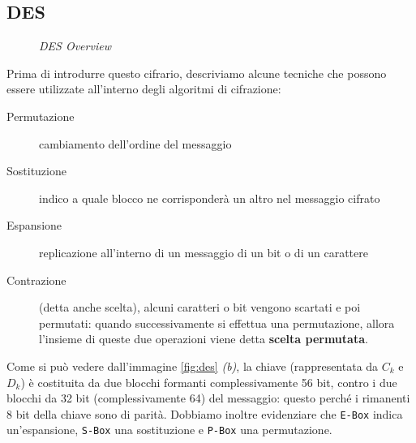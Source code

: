 \subsection{DES}
\begin{figure}[!t]
 \centering
 \caption{\emph{DES Overview}}\label{fig:des}
\end{figure}
Prima di introdurre questo cifrario, descriviamo alcune tecniche che possono
essere utilizzate all'interno degli algoritmi di cifrazione:
\begin{description}
\item[Permutazione] cambiamento dell'ordine del messaggio
\item[Sostituzione] indico a quale blocco ne corrisponderà un altro nel messaggio
	cifrato
\item[Espansione] replicazione all'interno di un messaggio di un bit o di un 
	carattere
\item[Contrazione] (detta anche scelta), 
	alcuni caratteri o bit vengono scartati e poi permutati: quando 
	successivamente si effettua una permutazione, allora l'insieme di 
	queste due operazioni viene detta \textbf{scelta permutata}.
\end{description}
Come si può vedere dall'immagine \vref{fig:des} \emph{(b)}, la chiave (rappresentata
da $C_k$ e $D_k$) è costituita da due blocchi formanti complessivamente 56 
bit, contro i due blocchi da 32 bit (complessivamente 64) del messaggio: questo
perché i rimanenti 8 bit della chiave sono di parità. Dobbiamo inoltre evidenziare
che \texttt{E-Box} indica un'espansione, \texttt{S-Box} una sostituzione e \texttt{P-Box}
una permutazione.

